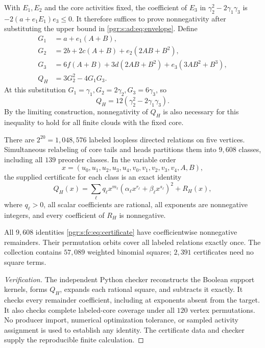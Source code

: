 \documentclass[11pt]{article}
\numberwithin{equation}{section}
\theoremstyle{definition}\newtheorem{definition}[theorem]{Definition}\newtheorem{remark}[theorem]{Remark}
\begin{document}
With $E_1,E_2$ and the core activities fixed, the coefficient of $E_3$ in
$\gamma_2^2-2\gamma_1\gamma_3$ is $-2(a+e_1E_1)e_3\le0$.
It therefore suffices to prove nonnegativity after substituting the upper bound in \eqref{pgr:s:ad:eq:envelope}. Define
\begin{align*}
 G_1&=a+e_1(A+B),\\
 G_2&=2b+2c(A+B)+e_2(2AB+B^2),\\
 G_3&=6f(A+B)+3d(2AB+B^2)+e_3(3AB^2+B^3),\\
 Q_H&=3G_2^2-4G_1G_3.
\end{align*}
At this substitution $G_1=\gamma_1,G_2=2\gamma_2,G_3=6\gamma_3$, so
\begin{equation}\label{pgr:s:fc:eq:scale}
 Q_H=12(\gamma_2^2-2\gamma_1\gamma_3).
\end{equation}
By the limiting construction, nonnegativity of $Q_H$ is also necessary for this inequality to hold for all finite clouds with the fixed core.

There are $2^{20}=1,048,576$ labeled loopless directed relations on five vertices. Simultaneous relabeling of core tails and heads partitions them into $9,608$ classes, including all $139$ preorder classes. In the variable order
\[
 x=(u_0,u_1,u_2,u_3,u_4,v_0,v_1,v_2,v_3,v_4,A,B),
\]
the supplied certificate for each class is an exact identity
\begin{equation}\label{pgr:s:fc:eq:certificate}
 Q_H(x)=\sum_\ell q_\ell x^{m_\ell}
              (\alpha_\ell x^{r_\ell}+\beta_\ell x^{s_\ell})^2+R_H(x),
\end{equation}
where $q_\ell>0$, all scalar coefficients are rational, all exponents are nonnegative integers, and every coefficient of $R_H$ is nonnegative.

\begin{proposition}\label{pgr:s:fc:prop:cert}
All $9,608$ identities \eqref{pgr:s:fc:eq:certificate} have coefficientwise nonnegative remainders. Their permutation orbits cover all labeled relations exactly once. The collection contains $57,089$ weighted binomial squares; $2,391$ certificates need no square terms.
\end{proposition}
\begin{proof}[Verification]
The independent Python checker reconstructs the Boolean support kernels, forms $Q_H$, expands each rational square, and subtracts it exactly. It checks every remainder coefficient, including at exponents absent from the target. It also checks complete labeled-core coverage under all $120$ vertex permutations. No producer import, numerical optimization tolerance, or sampled activity assignment is used to establish any identity. The certificate data and checker supply the reproducible finite calculation.
\end{proof}
\end{document}
